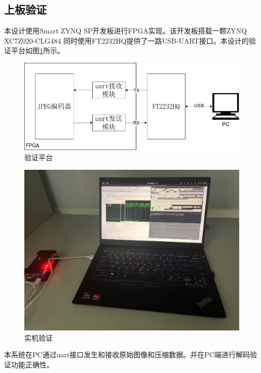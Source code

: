 \documentclass{article}
\numberwithin {equation}{section}
\begin{document}
\begin{spacing}{1.25}
  \subsection{上板验证}
    本设计使用Smart ZYNQ SP开发板进行FPGA实现。该开发板搭载一颗ZYNQ XC7Z020-CLG484
    同时使用FT2232HQ提供了一路USB-UART接口。本设计的验证平台如图\ref{FPGA}所示。
    \begin{figure}[H]
      \centering
      \includegraphics[scale=0.40]{./pictures/验证平台.png}
      \caption{验证平台}
      \label{FPGA}
    \end{figure}

    \begin{figure}[H]
      \centering
      \includegraphics[scale=0.20]{./pictures/实机验证.jpg}
      \caption{实机验证}
      \label{fpga test}
    \end{figure}
    本系统在PC通过uart接口发生和接收原始图像和压缩数据。并在PC端进行解码验证功能正确性。


\newpage
  \vspace{1em}




\end{spacing}
\end{document}
